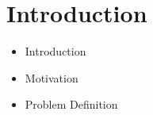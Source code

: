 \section{Introduction}

\begin{itemize}
    \item Introduction
    \item Motivation
    \item Problem Definition
\end{itemize}
